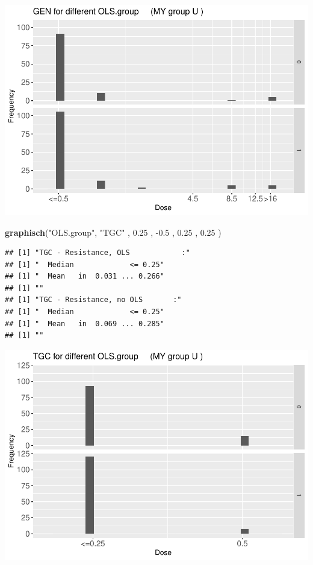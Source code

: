 \documentclass[
]{article}
\newenvironment{Shaded}{\begin{snugshade}}{\end{snugshade}}
\newcommand{\FloatTok}[1]{\textcolor[rgb]{0.00,0.00,0.81}{#1}}
\newcommand{\KeywordTok}[1]{\textcolor[rgb]{0.13,0.29,0.53}{\textbf{#1}}}
\newcommand{\NormalTok}[1]{#1}
\newcommand{\StringTok}[1]{\textcolor[rgb]{0.31,0.60,0.02}{#1}}
\begin{document}
\includegraphics{Verteilungen_files/figure-latex/unnamed-chunk-22-1.pdf}

\begin{Shaded}
\begin{Highlighting}[]
  \KeywordTok{graphisch}\NormalTok{(}\StringTok{"OLS.group"}\NormalTok{, }\StringTok{"TGC"}\NormalTok{ , }\FloatTok{0.25}\NormalTok{ ,  }\FloatTok{-0.5}\NormalTok{ ,   }\FloatTok{0.25}\NormalTok{ ,   }\FloatTok{0.25}\NormalTok{ )  }
\end{Highlighting}
\end{Shaded}

\begin{verbatim}
## [1] "TGC - Resistance, OLS            :"
## [1] "  Median             <= 0.25"
## [1] "  Mean   in  0.031 ... 0.266"
## [1] ""
## [1] "TGC - Resistance, no OLS       :"
## [1] "  Median             <= 0.25"
## [1] "  Mean   in  0.069 ... 0.285"
## [1] ""
\end{verbatim}

\includegraphics{Verteilungen_files/figure-latex/unnamed-chunk-23-1.pdf}
\end{document}
